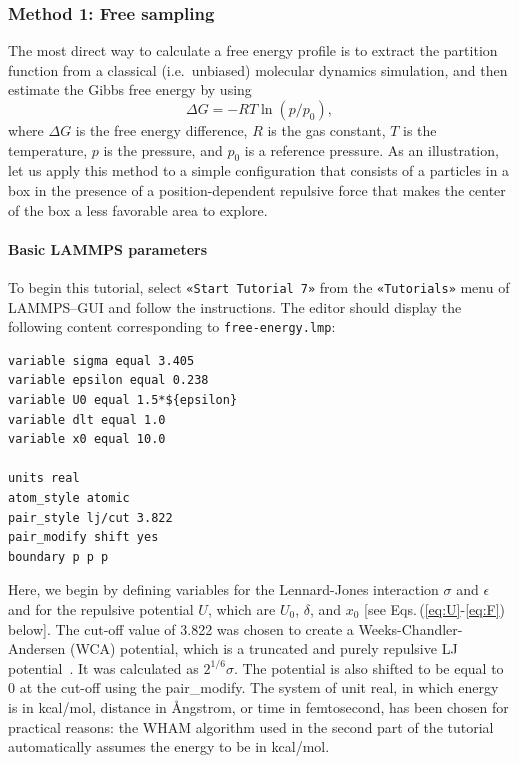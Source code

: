 \documentclass[9pt,tutorial]{livecoms}
\newcommand{\lmpcmd}[1]{\hspace{0pt}\colorbox{listing}{\textcolor{command}{\small{#1}}}\hspace{0pt}} %
\newcommand{\flecmd}[1]{\textcolor{command}{\texttt{#1}}} %
\newcommand{\guicmd}[1]{\textcolor{command}{\texttt{«#1»}}} %
\begin{document}
\subsubsection{Method 1: Free sampling}
The most direct way to calculate a free energy profile is to extract the partition
function from a classical (i.e.~unbiased) molecular dynamics simulation, and
then estimate the Gibbs free energy by using
\begin{equation}
\Delta G = -RT \ln(p/p_0),
\label{eq:G}
\end{equation}
where $\Delta G$ is the free energy difference, $R$ is the gas constant, $T$
is the temperature, $p$ is the pressure, and $p_0$ is a reference pressure.
As an illustration, let us apply this method to a simple configuration
that consists of a particles in a box in the presence of a
position-dependent repulsive force that makes the center of the box a less
favorable area to explore.

\paragraph{Basic LAMMPS parameters}

To begin this tutorial, select \guicmd{Start Tutorial 7} from the
\guicmd{Tutorials} menu of LAMMPS--GUI and follow the instructions.
The editor should display the following content corresponding to \flecmd{free-energy.lmp}:
\begin{lstlisting}
variable sigma equal 3.405
variable epsilon equal 0.238
variable U0 equal 1.5*${epsilon}
variable dlt equal 1.0
variable x0 equal 10.0

units real
atom_style atomic
pair_style lj/cut 3.822
pair_modify shift yes
boundary p p p
\end{lstlisting}
Here, we begin by defining variables for the Lennard-Jones interaction
$\sigma$ and $\epsilon$ and for the repulsive potential $U$, which are $U_0$, $\delta$, and $x_0$
[see Eqs.\,(\ref{eq:U}-\ref{eq:F}) below].  The cut-off value of 3.822 was chosen
to create a Weeks-Chandler-Andersen (WCA) potential, which is a truncated and
purely repulsive LJ potential~\cite{weeks1971role}.  It was calculated
as $2^{1/6} \sigma$.  The potential is also shifted to be
equal to 0 at the cut-off using the \lmpcmd{pair\_modify}.  The system of unit
\lmpcmd{real}, in which energy is in kcal/mol, distance in Ångstrom, or time in
femtosecond, has been chosen for practical reasons: the WHAM algorithm used in
the second part of the tutorial automatically assumes the energy to be in kcal/mol.
\end{document}
